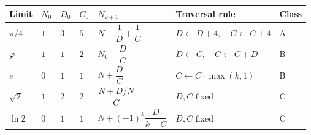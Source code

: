 \documentclass[12pt]{article}
\begin{document}
\begin{longtable}[]{@{}
  >{\raggedright\arraybackslash}p{}
  >{\raggedright\arraybackslash}p{}
  >{\raggedright\arraybackslash}p{}
  >{\raggedright\arraybackslash}p{}
  >{\raggedright\arraybackslash}p{}
  >{\raggedright\arraybackslash}p{}
  >{\raggedright\arraybackslash}p{}@{}}
\toprule\noalign{}
\begin{minipage}[b]{\linewidth}\raggedright
Limit
\end{minipage} & \begin{minipage}[b]{\linewidth}\raggedright
\(N_0\)
\end{minipage} & \begin{minipage}[b]{\linewidth}\raggedright
\(D_0\)
\end{minipage} & \begin{minipage}[b]{\linewidth}\raggedright
\(C_0\)
\end{minipage} & \begin{minipage}[b]{\linewidth}\raggedright
\(N_{k+1}\)
\end{minipage} & \begin{minipage}[b]{\linewidth}\raggedright
Traversal rule
\end{minipage} & \begin{minipage}[b]{\linewidth}\raggedright
Class
\end{minipage} \\
\midrule\noalign{}
\endhead
\bottomrule\noalign{}
\endlastfoot
\(\pi/4\) & \(1\) & \(3\) & \(5\) & \(N - \dfrac{1}{D} + \dfrac{1}{C}\)
& \(D \leftarrow D+4,\quad C \leftarrow C+4\) & A \\
\(\varphi\) & \(1\) & \(1\) & \(2\) & \(N_0 + \dfrac{D}{C}\) &
\(D \leftarrow C,\quad C \leftarrow C + D\) & B \\
\(e\) & \(0\) & \(1\) & \(1\) & \(N + \dfrac{D}{C}\) &
\(C \leftarrow C \cdot \max(k,1)\) & B \\
\(\sqrt{2}\) & \(1\) & \(2\) & \(2\) & \(\dfrac{N + D/N}{C}\) & \(D, C\)
fixed & C \\
\(\ln 2\) & \(0\) & \(1\) & \(1\) & \(N + (-1)^k \dfrac{D}{k + C}\) &
\(D, C\) fixed & C \\
\end{longtable}
\end{document}
